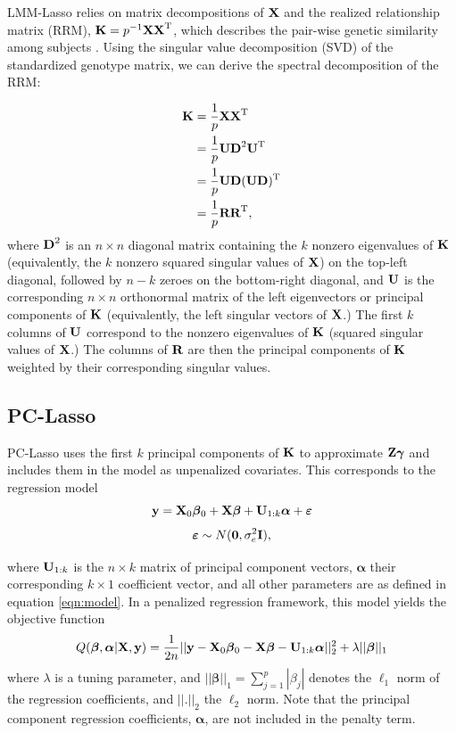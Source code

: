 LMM-Lasso relies on matrix decompositions of $\textbf{X}$ and the realized relationship matrix (RRM), $\textbf{K} = p^{-1} \textbf{X} \textbf{X}^{\text{T}}$, which describes the pair-wise genetic similarity among subjects \citep{hayes2009increased}. Using the singular value decomposition (SVD) of the standardized genotype matrix, we can derive the spectral decomposition of the RRM: 

\begin{align}
    \label{eqn:k}
    \textbf{K} &= \frac{1}{p} \textbf{X} \textbf{X}^{\text{T}} \nonumber \\
                   &= \frac{1}{p} \textbf{U} \textbf{D}^2 \textbf{U}^{\text{T}} \nonumber \\
                   &= \frac{1}{p} \textbf{U} \textbf{D} (\textbf{U} \textbf{D})^{\text{T}} \nonumber \\
                   &= \frac{1}{p} \textbf{R} \textbf{R}^{\text{T}},
\end{align}
where $\textbf{D}^2$ is an $n \times n$ diagonal matrix containing the $k$ nonzero eigenvalues of $\textbf{K}$ (equivalently, the $k$ nonzero squared singular values of $\textbf{X}$) on the top-left diagonal, followed by $n - k$ zeroes on the bottom-right diagonal, and $\textbf{U}$ is the corresponding $n \times n$ orthonormal matrix of the left eigenvectors or principal components of $\textbf{K}$ (equivalently, the left singular vectors of $\textbf{X}$.) The first $k$ columns of $\textbf{U}$ correspond to the nonzero eigenvalues of $\textbf{K}$ (squared singular values of $\textbf{X}$.) The columns of $\textbf{R}$ are then the principal components of $\textbf{K}$ weighted by their corresponding singular values. 

\subsection{PC-Lasso}
PC-Lasso uses the first $k$ principal components of $\textbf{K}$ to approximate $\textbf{Z}\boldsymbol{\gamma}$ and includes them in the model as unpenalized covariates. This corresponds to the regression model
\begin{equation}
    \label{eqn:pca_reg}
    \textbf{y} = \textbf{X}_0\boldsymbol{\beta}{}_0 + \textbf{X}\boldsymbol{\beta}{} + \textbf{U}_{1:k}\boldsymbol{\alpha} + \boldsymbol{\varepsilon}{} 
\end{equation}
$$ \boldsymbol{\varepsilon}{} \sim N(\boldsymbol{0}, \sigma^2_e \textbf{I}), $$

where $\textbf{U}_{1:k}$ is the $n \times k$ matrix of principal component vectors, $\boldsymbol{\alpha}$ their corresponding $k \times 1$ coefficient vector, and all other parameters are as defined in equation \eqref{eqn:model}. In a penalized regression framework, this model yields the objective function
\begin{equation}
    \label{eqn:pca_obj}
    Q(\boldsymbol{\beta}{}, \boldsymbol{\alpha}|\textbf{X}, \textbf{y}) = \frac{1}{2n} ||\textbf{y} - \textbf{X}_0\boldsymbol{\beta}{}_0 - \textbf{X} \boldsymbol{\beta}{}- \textbf{U}_{1:k}\boldsymbol{\alpha}||_2^2 + \lambda || \boldsymbol{\beta}{} ||_1
\end{equation}
where $\lambda$ is a tuning parameter, and $|| \boldsymbol{\beta} ||_1 = \sum_{j=1}^p |\beta_j|$ denotes the $\ell_1$ norm of the regression coefficients, and $||.||_2$ the $\ell_2$ norm. Note that the principal component regression coefficients, $\boldsymbol{\alpha}$, are not included in the penalty term. 

